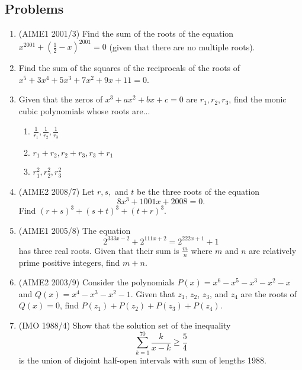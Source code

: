 \subsection{Problems}
\begin{enumerate}
\item (AIME1 2001/3) Find the sum of the roots of the equation $x^{2001}+\left(\frac 12-x\right)^{2001}=0$ (given that there are no multiple roots).
\item Find the sum of the squares of the reciprocals of the roots of $x^5+3x^4+5x^3+7x^2+9x+11=0$.
\item Given that the zeros of $x^3+ax^2+bx+c=0$ are $r_1,r_2,r_3$, find the monic cubic polynomials whose roots are...
\begin{enumerate}
\item $\frac{1}{r_1},\frac{1}{r_2},\frac{1}{r_3}$
\item $r_1+r_2,r_2+r_3,r_3+r_1$
\item $r_1^2, r_2^2, r_3^2$
\end{enumerate}
\item (AIME2 2008/7) Let $r, s,$ and $t$ be the three roots of the equation
\[8x^3+1001x+2008=0.\]
Find $(r+s)^3 +(s+t)^3+(t+r)^3$.
\item (AIME1 2005/8) The equation
\[2^{333x-2}+2^{111x+2}=2^{222x+1}+1\]
has three real roots. Given that their sum is $\frac m n$ where $m$ and $n$ are relatively prime positive integers, find $m+n$.
\item (AIME2 2003/9) Consider the polynomials $P(x)=x^6-x^5-x^3-x^2-x$ and $Q(x)=x^4-x^3-x^2-1$. Given that $z_1$, $z_2$, $z_3$, and $z_4$ are the roots of $Q(x)=0$, find $P(z_1)+P(z_2)+P(z_3)+P(z_4)$.
\item (IMO 1988/4) Show that the solution set of the inequality
\[
\sum_{k=1}^{70} \frac{k}{x-k}\ge \frac 54
\]
is the union of disjoint half-open intervals with sum of lengths 1988.
\end{enumerate}

